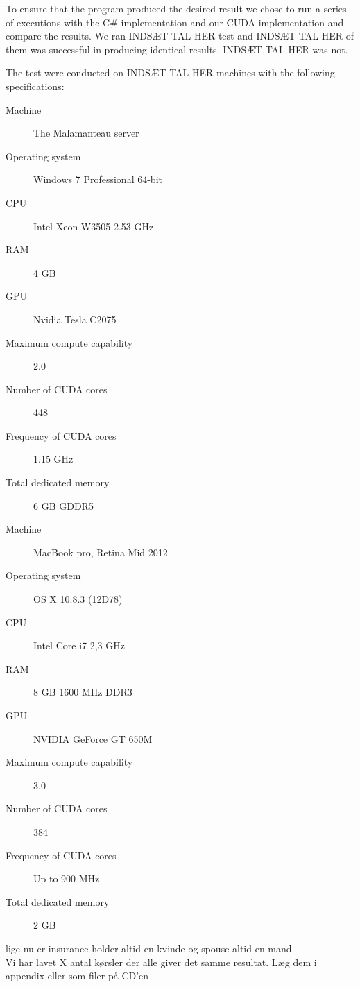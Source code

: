 To ensure that the program produced the desired result we chose to run a series of executions with the C\# implementation and our CUDA implementation and compare the results. We ran INDSÆT TAL HER test and INDSÆT TAL HER of them was successful in producing identical results. INDSÆT TAL HER was not. 

The test were conducted on INDSÆT TAL HER machines with the following specifications:

\begin{description}
	\item[Machine] The Malamanteau server 
	\item[Operating system] Windows 7 Professional 64-bit
	\item[CPU] Intel Xeon W3505 2.53 GHz
	\item[RAM] 4 GB 
	\item[GPU] Nvidia Tesla C2075\cite{tesl}
	\item[Maximum compute capability] 2.0
	\item[Number of CUDA cores] 448
	\item[Frequency of CUDA cores] 1.15 GHz
	\item[Total dedicated memory] 6 GB GDDR5
\end{description}

\begin{description}
	\item[Machine] MacBook pro, Retina Mid 2012
	\item[Operating system] OS X 10.8.3 (12D78)
	\item[CPU] Intel Core i7 2,3 GHz
	\item[RAM] 8 GB 1600 MHz DDR3
	\item[GPU] NVIDIA GeForce GT 650M \cite{kepl}
	\item[Maximum compute capability] 3.0
	\item[Number of CUDA cores] 384
	\item[Frequency of CUDA cores] Up to 900 MHz
	\item[Total dedicated memory] 2 GB
\end{description}

lige nu er insurance holder altid en kvinde og spouse altid en mand \\

Vi har lavet X antal kørsler der alle giver det samme resultat. Læg dem i appendix eller som filer på CD'en
